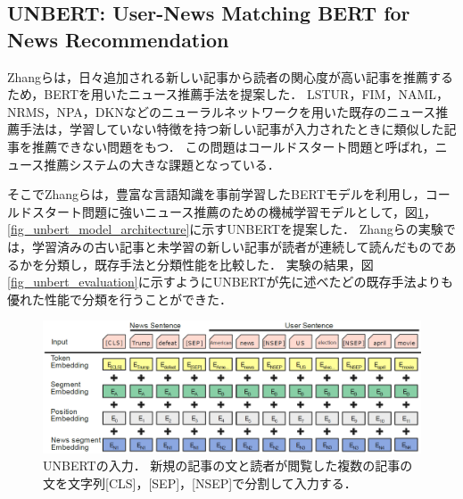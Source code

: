 \documentclass[12pt,a4j,dvipdfmx]{jreport}
\begin{document}
\subsection{UNBERT: User-News Matching BERT for News Recommendation}
Zhangらは，日々追加される新しい記事から読者の関心度が高い記事を推薦するため，BERTを用いたニュース推薦手法を提案した\cite{zhang_unbert_2021}．
LSTUR，FIM，NAML，NRMS，NPA，DKNなどのニューラルネットワークを用いた既存のニュース推薦手法は，学習していない特徴を持つ新しい記事が入力されたときに類似した記事を推薦できない問題をもつ．
この問題はコールドスタート問題と呼ばれ，ニュース推薦システムの大きな課題となっている．

そこでZhangらは，豊富な言語知識を事前学習したBERTモデルを利用し，コールドスタート問題に強いニュース推薦のための機械学習モデルとして，図\ref{fig_unbert_inputs}，\ref{fig_unbert_model_architecture}に示すUNBERTを提案した．
Zhangらの実験では，学習済みの古い記事と未学習の新しい記事が読者が連続して読んだものであるかを分類し，既存手法と分類性能を比較した．
実験の結果，図\ref{fig_unbert_evaluation}に示すようにUNBERTが先に述べたどの既存手法よりも優れた性能で分類を行うことができた．

\begin{figure}[H]
	\centering
	\includegraphics[keepaspectratio, width=120mm]{img/unbert_inputs.png}
	\caption{
    UNBERTの入力．
    \protect\footnotemark[10]
    新規の記事の文と読者が閲覧した複数の記事の文を文字列[CLS]，[SEP]，[NSEP]で分割して入力する．
  }
	\label{fig_unbert_inputs}
\end{figure}
\end{document}
